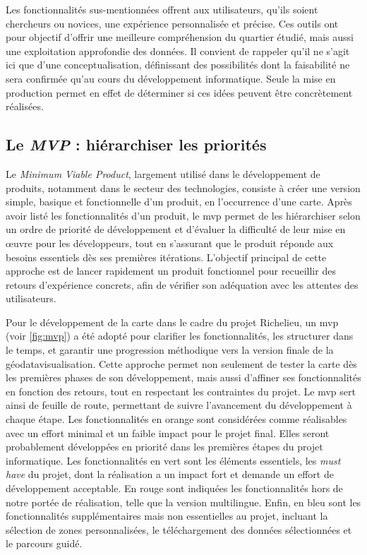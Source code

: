 Les fonctionnalités sus-mentionnées offrent aux utilisateurs, qu'ils soient chercheurs ou novices, une expérience personnalisée et précise. Ces outils ont pour objectif d'offrir une meilleure compréhension du quartier étudié, mais aussi une exploitation approfondie des données. Il convient de rappeler qu'il ne s'agit ici que d'une conceptualisation, définissant des possibilités dont la faisabilité ne sera confirmée qu'au cours du développement informatique. Seule la mise en production permet en effet de déterminer si ces idées peuvent être concrètement réalisées. 

\subsection{Le \textit{MVP} : hiérarchiser les priorités}
Le \textit{Minimum Viable Product}, largement utilisé dans le développement de produits, notamment dans le secteur des technologies, consiste à créer une version simple, basique et fonctionnelle d'un produit, en l'occurrence d'une carte. Après avoir listé les fonctionnalités d'un produit, le  \acrshort{mvp} permet de les hiérarchiser selon un ordre de priorité de développement et d'évaluer la difficulté de leur mise en œuvre pour les développeurs, tout en s'assurant que le produit réponde aux besoins essentiels dès ses premières itérations. L'objectif principal de cette approche est de lancer rapidement un produit fonctionnel pour recueillir des retours d'expérience concrets, afin de vérifier son adéquation avec les attentes des utilisateurs. 

Pour le développement de la carte dans le cadre du projet Richelieu, un  \acrshort{mvp} (voir \ref{fig:mvp}) a été adopté pour clarifier les fonctionnalités, les structurer dans le temps, et garantir une progression méthodique vers la version finale de la géodatavisualisation. Cette approche permet non seulement de tester la carte dès les premières phases de son développement, mais aussi d'affiner ses fonctionnalités en fonction des retours, tout en respectant les contraintes du projet. Le  \acrshort{mvp} sert ainsi de feuille de route, permettant de suivre l'avancement du développement à chaque étape. Les fonctionnalités en orange sont considérées comme réalisables avec un effort minimal et un faible impact pour le projet final. Elles seront probablement développées en priorité dans les premières étapes du projet informatique. Les fonctionnalités en vert sont les éléments essentiels, les \textit{must have} du projet, dont la réalisation a un impact fort et demande un effort de développement acceptable. En rouge sont indiquées les fonctionnalités hors de notre portée de réalisation, telle que la version multilingue. Enfin, en bleu sont les fonctionnalités supplémentaires mais non essentielles au projet, incluant la sélection de zones personnalisées, le téléchargement des données sélectionnées et le parcours guidé. 

